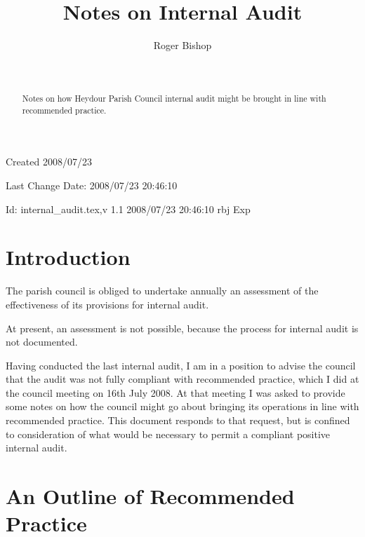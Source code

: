 \documentclass[numreferences]{rbjk}
\begin{document}
                                                                                   
\begin{article}
\begin{opening}  
\title{Notes on Internal Audit}
\author{Roger Bishop }
\date{$ $\ $ $}

\begin{abstract}
Notes on how Heydour Parish Council internal audit might be brought in line with recommended practice.
\end{abstract}

\end{opening}

\vfill

\begin{centering}
\footnotesize{
Created 2008/07/23

Last Change $ $Date: 2008/07/23 20:46:10 $ $

$ $Id: internal_audit.tex,v 1.1 2008/07/23 20:46:10 rbj Exp $ $\\

}%
\end{centering}

\setcounter{tocdepth}{4}
{\parskip-0pt\tableofcontents}

\section{Introduction}

The parish council is obliged to undertake annually an assessment of the effectiveness of its provisions for internal audit.

At present, an assessment is not possible, because the process for internal audit is not documented.

Having conducted the last internal audit, I am in a position to advise the council that the audit was not fully compliant with recommended practice, which I did at the council meeting on 16th July 2008.
At that meeting I was asked to provide some notes on how the council might go about bringing its operations in line with recommended practice.
This document responds to that request, but is confined to consideration of what would be necessary to permit a compliant positive internal audit.

\section{An Outline of Recommended Practice}


\end{article}
\end{document}

